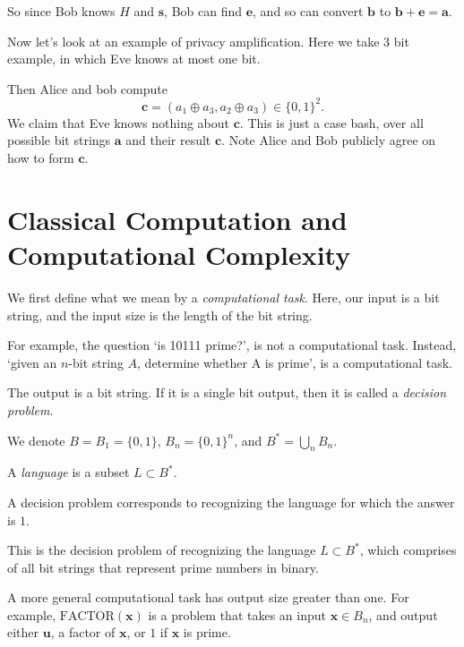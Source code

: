 \documentclass[12pt]{article}
\begin{document}
So since Bob knows $H$ and $\mathbf{s}$, Bob can find $\mathbf{e}$, and so can convert $\mathbf{b}$ to $\mathbf{b} + \mathbf{e} = \mathbf{a}$.

Now let's look at an example of privacy amplification. Here we take 3 bit example, in which Eve knows at most one bit.

Then Alice and bob compute
\[
	\mathbf{c} = (a_1 \oplus a_3, a_2 \oplus a_3) \in \{0, 1\}^2.
\]
We claim that Eve knows nothing about $\mathbf{c}$. This is just a case bash, over all possible bit strings $\mathbf{a}$ and their result $\mathbf{c}$. Note Alice and Bob publicly agree on how to form $\mathbf{c}$.

\newpage

\section{Classical Computation and Computational Complexity}
\label{sec:cc}

We first define what we mean by a \emph{computational task}. Here, our input is a bit string, and the input size is the length of the bit string.

For example, the question `is 10111 prime?', is not a computational task. Instead, `given an $n$-bit string $A$, determine whether A is prime', is a computational task.

The output is a bit string. If it is a single bit output, then it is called a \emph{decision problem}.

We denote $B = B_1 = \{0, 1\}$, $B_n = \{0, 1\}^n$, and $B^\ast = \bigcup_n B_n$.

\begin{definition}
	A \emph{language} is a subset $L \subset B^\ast$.

	A decision problem corresponds to recognizing the language for which the answer is $1$.
\end{definition}

\begin{exbox}
	This is the decision problem of recognizing the language $L \subset B^\ast$, which comprises of all bit strings that represent prime numbers in binary.

	A more general computational task has output size greater than one. For example, $\mathrm{FACTOR}(\mathbf{x})$ is a problem that takes an input $\mathbf{x} \in B_n$, and output either $\mathbf{u}$, a factor of $\mathbf{x}$, or $1$ if $\mathbf{x}$ is prime.
\end{exbox}
\end{document}
